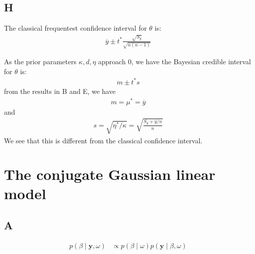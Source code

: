\documentclass{article}
\begin{document}
\subsection*{H}
The classical frequentest confidence interval for \(\theta\) is:
\begin{align*}
\overline{y} \pm t^*\frac{\sqrt{S_y}}{\sqrt{n(n-1)}}
\end{align*}

As the prior parameters \(\kappa, d, \eta\) approach \(0\), we have the Bayesian credible interval for \(\theta\) is:
\begin{align*}
m \pm t^*s
\end{align*}
from the results in B and E, we have
\begin{align*}
m = \mu^* = \overline{y}
\end{align*}
and
\begin{align*}
s = \sqrt{\eta^*/\kappa} = \sqrt{\frac{S_y + \overline{y}/n}{n}}
\end{align*}
We see that this is different from the classical confidence interval.
\section{The conjugate Gaussian linear model}
\subsection*{A}
\begin{align*}
p(\beta \mid \mathbf{y}, \omega) &\propto p(\beta \mid \omega) p(\mathbf{y} \mid \beta, \omega)\\
\end{align*}
\end{document}
